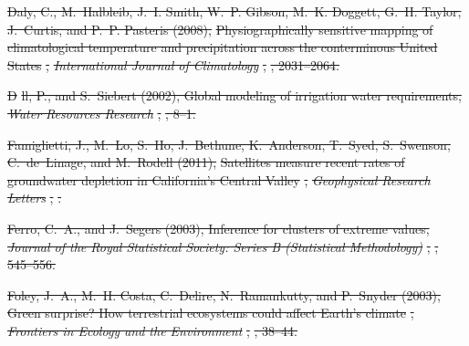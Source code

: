 \documentclass[draft,ms]{agutex}   %
\providecommand{\DIFdel}[1]{{\protect\color{red}\sout{#1}}}                      %
\begin{document}
\begin{article}
\DIFdel{Daly, C., M.~Halbleib, J.~I. Smith, W.~P. Gibson, M.~K. Doggett, G.~H. Taylor,
  J.~Curtis, and P.~P. Pasteris (2008), }%
\DIFdel{Physiographically sensitive mapping of
  climatological temperature and precipitation across the conterminous United
  States}%
\DIFdel{, }\textit{\DIFdel{International Journal of Climatology}}%
\DIFdel{, }%
\DIFdel{,
  2031--2064.
}%

\DIFdel{D}%
\DIFdel{ll, P., and S.~Siebert (2002), Global modeling of irrigation water
  requirements, }\textit{\DIFdel{Water Resources Research}}%
\DIFdel{, }%
\DIFdel{, 8--1.
}%

\DIFdel{Famiglietti, J., M.~Lo, S.~Ho, J.~Bethune, K.~Anderson, T.~Syed, S.~Swenson,
  C.~de~Linage, and M.~Rodell (2011), }%
\DIFdel{Satellites measure recent rates of
  groundwater depletion in California's Central Valley}%
\DIFdel{, }\textit{\DIFdel{Geophysical
  Research Letters}}%
\DIFdel{, }%
\DIFdel{.
}%

\DIFdel{Ferro, C.~A., and J.~Segers (2003), Inference for clusters of extreme values,
  }\textit{\DIFdel{Journal of the Royal Statistical Society: Series B (Statistical
  Methodology)}}%
\DIFdel{, }%
\DIFdel{, 545--556.
}%

\DIFdel{Foley, J.~A., M.~H. Costa, C.~Delire, N.~Ramankutty, and P.~Snyder (2003),
  }%
\DIFdel{Green surprise? How terrestrial ecosystems could affect Earth's climate}%
\DIFdel{,
  }\textit{\DIFdel{Frontiers in Ecology and the Environment}}%
\DIFdel{, }%
\DIFdel{, 38--44.
}%


\end{article}
\end{document}
